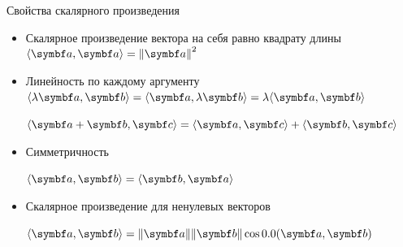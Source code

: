 \begin{frame}{Свойства скалярного произведения}

  
  \begin{itemize}[<+->]
  \item Скалярное произведение вектора на себя равно квадрату длины
  $\langle \ba, \ba \rangle = \norm{\ba}^2$

  \item Линейность по каждому аргументу
  $\langle \lambda \ba, \bb \rangle = \langle \ba,  \lambda  \bb \rangle = \lambda  \langle \ba,  \bb \rangle$

  $\langle \ba + \bb, \bc \rangle = \langle \ba , \bc \rangle + \langle \bb , \bc \rangle$

  \item Симметричность
  
  $\langle \ba, \bb \rangle = \langle \bb, \ba \rangle$

  \item Скалярное произведение для ненулевых векторов
  
  $\langle \ba, \bb \rangle = \norm{\ba}\norm{\bb} \cos \angle(\ba, \bb)$
  \end{itemize}
  
  

\end{frame}




